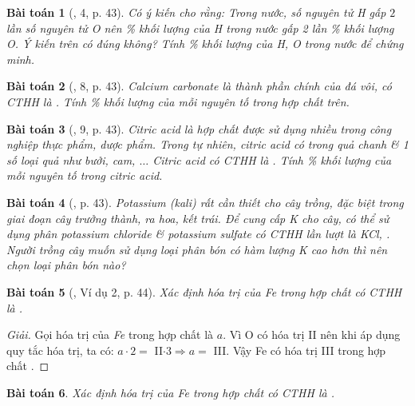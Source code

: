 \documentclass{article}
\newtheorem{baitoan}{Bài toán}
\begin{document}
\begin{baitoan}[\cite{SGK_KHTN_7_Canh_Dieu}, 4, p. 43]
	Có ý kiến cho rằng: Trong nước, số nguyên tử \emph{H} gấp $2$ lần số nguyên tử \emph{O} nên \% khối lượng của \emph{H} trong nước gấp 2 lần \% khối lượng \emph{O}. Ý kiến trên có đúng không? Tính \% khối lượng của \emph{H, O} trong nước để chứng minh.
\end{baitoan}

\begin{baitoan}[\cite{SGK_KHTN_7_Canh_Dieu}, 8, p. 43]
	Calcium carbonate là thành phần chính của đá vôi, có {\rm CTHH} là \emph{}. Tính \% khối lượng của mỗi nguyên tố trong hợp chất trên.
\end{baitoan}

\begin{baitoan}[\cite{SGK_KHTN_7_Canh_Dieu}, 9, p. 43]
	Citric acid là hợp chất được sử dụng nhiều trong công nghiệp thực phẩm, dược phẩm. Trong tự nhiên, citric acid có trong quả chanh \& 1 số loại quả như bưởi, cam, $\ldots$  Citric acid có {\rm CTHH} là \emph{}. Tính \% khối lượng của mỗi nguyên tố trong citric acid.
\end{baitoan}

\begin{baitoan}[\cite{SGK_KHTN_7_Canh_Dieu}, p. 43]
	Potassium (kali) rất cần thiết cho cây trồng, đặc biệt trong giai đoạn cây trưởng thành, ra hoa, kết trái. Để cung cấp \emph{K} cho cây, có thể sử dụng phân potassium chloride \& potassium sulfate có {\rm CTHH} lần lượt là \emph{KCl, }. Người trồng cây muốn sử dụng loại phân bón có hàm lượng \emph{K} cao hơn thì nên chọn loại phân bón nào?
\end{baitoan}

\begin{baitoan}[\cite{SGK_KHTN_7_Canh_Dieu}, Ví dụ 2, p. 44]
	Xác định hóa trị của \emph{Fe} trong hợp chất có {\rm CTHH} là \emph{}.
\end{baitoan}

\begin{proof}[Giải]
	Gọi hóa trị của \emph{Fe} trong hợp chất là $a$. Vì O có hóa trị II nên khi áp dụng quy tắc hóa trị, ta có: $a\cdot2 =$ II$\cdot3\Rightarrow a =$ III. Vậy Fe có hóa trị III trong hợp chất .
\end{proof}

\begin{baitoan}
	Xác định hóa trị của \emph{Fe} trong hợp chất có {\rm CTHH} là \emph{}.
\end{baitoan}
\end{document}
